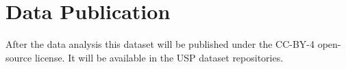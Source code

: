 \chapter{Data Publication}
\label{chap:proposal-data-publication}

After the data analysis this dataset will be published under the CC-BY-4 open-source license. It will be available in the USP dataset repositories.